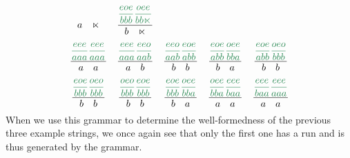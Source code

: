 \begin{examplebox}
\[\begin{array}{ccccc}
{                }
                {
                a \quad \RightEdge
                }
            &
            \kState{
                \kState{eoe}{b b b}
                \kState{oee}{b b \RightEdge}
                }
                {
                b \quad \RightEdge
                }
            \\[12pt]
            \kState{
                \kState{eee}{a a a}
                \kState{eee}{a a a}
                }
                {
                a \quad a
                }
            &
            \kState{
                \kState{eee}{a a a}
                \kState{eeo}{a a b}
                }
                {
                a \quad b
                }
            &
            \kState{
                \kState{eeo}{a a b}
                \kState{eoe}{a b b}
                }
                {
                b \quad b
                }
            &
            \kState{
                \kState{eoe}{a b b}
                \kState{oee}{b b a}
                }
                {
                b \quad a
                }
            &
            \kState{
                \kState{eoe}{a b b}
                \kState{oeo}{b b b}
                }
                {
                b \quad b
                }
            \\[12pt]
            \kState{
                \kState{eoe}{b b b}
                \kState{oeo}{b b b}
                }
                {
                b \quad b
                }
            &
            \kState{
                \kState{oeo}{b b b}
                \kState{eoe}{b b b}
                }
                {
                b \quad b
                }
            &
            \kState{
                \kState{eoe}{b b b}
                \kState{oee}{b b a}
                }
                {
                b \quad a
                }
            &
            \kState{
                \kState{oee}{b b a}
                \kState{eee}{b a a}
                }
                {
                a \quad a
                }
            &
            \kState{
                \kState{eee}{b a a}
                \kState{eee}{a a a}
                }
                {
                a \quad a
                }
        \end{array}
    \]
    When we use this grammar to determine the well-formedness of the previous three example strings, we once again see that only the first one has a run and is thus generated by the grammar.
    \[
        \begin{array}{ccccccc}

\end{array}\]
\end{examplebox}
